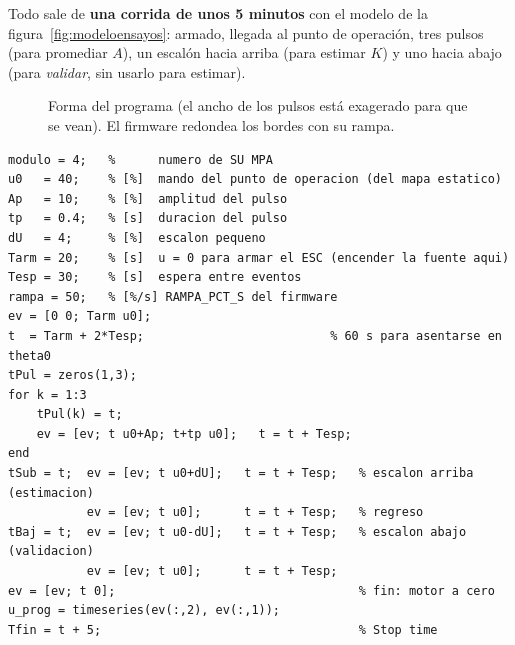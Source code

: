 \documentclass[11pt,letterpaper]{article}
\begin{document}
Todo sale de \textbf{una corrida de unos 5 minutos} con el modelo de la figura~\ref{fig:modeloensayos}: armado, llegada al punto de operación, tres pulsos (para promediar $A$), un escalón hacia arriba (para estimar $K$) y uno hacia abajo (para \emph{validar}, sin usarlo para estimar).

\begin{figure}[H]\centering
{}
\caption{Forma del programa (el ancho de los pulsos está exagerado para que se vean). El firmware redondea los bordes con su rampa.}\label{fig:programa}
\end{figure}

\begin{lstlisting}[caption={Programa del ensayo de identificación (\texttt{programa\_identificacion.m}).}]
modulo = 4;   %      numero de SU MPA
u0   = 40;    % [%]  mando del punto de operacion (del mapa estatico)
Ap   = 10;    % [%]  amplitud del pulso
tp   = 0.4;   % [s]  duracion del pulso
dU   = 4;     % [%]  escalon pequeno
Tarm = 20;    % [s]  u = 0 para armar el ESC (encender la fuente aqui)
Tesp = 30;    % [s]  espera entre eventos
rampa = 50;   % [%/s] RAMPA_PCT_S del firmware
ev = [0 0; Tarm u0];
t  = Tarm + 2*Tesp;                          % 60 s para asentarse en theta0
tPul = zeros(1,3);
for k = 1:3
    tPul(k) = t;
    ev = [ev; t u0+Ap; t+tp u0];   t = t + Tesp;
end
tSub = t;  ev = [ev; t u0+dU];   t = t + Tesp;   % escalon arriba (estimacion)
           ev = [ev; t u0];      t = t + Tesp;   % regreso
tBaj = t;  ev = [ev; t u0-dU];   t = t + Tesp;   % escalon abajo (validacion)
           ev = [ev; t u0];      t = t + Tesp;
ev = [ev; t 0];                                  % fin: motor a cero
u_prog = timeseries(ev(:,2), ev(:,1));
Tfin = t + 5;                                    % Stop time
\end{lstlisting}
\end{document}

